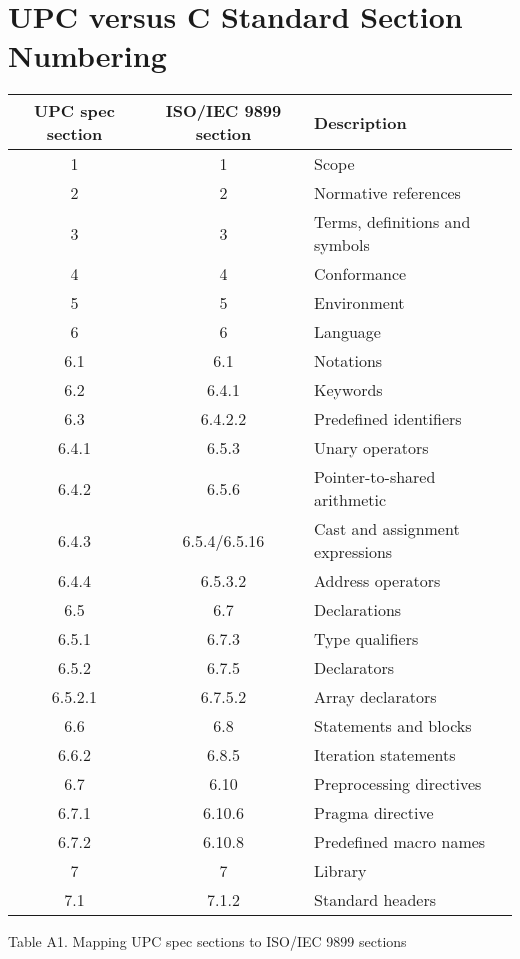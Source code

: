 \pagebreak
\section{UPC versus C Standard Section Numbering}

\begin{center}
\begin{tabular}{|c|c|l|}
\hline
UPC spec section  &   ISO/IEC 9899 section & Description \\
\hline
1   	& 1 		& Scope \\
2   	& 2 		& Normative references \\
3  	& 3 		& Terms, definitions and symbols \\
4   	& 4 		& Conformance \\
5  	& 5  		& Environment \\
6   	& 6  		& Language \\
6.1 	& 6.1		&   Notations \\
6.2 	& 6.4.1		&   Keywords \\
6.3 	& 6.4.2.2	&   Predefined identifiers \\
6.4.1 	& 6.5.3		&     Unary operators \\
6.4.2 	& 6.5.6		&     Pointer-to-shared arithmetic \\
6.4.3 	& 6.5.4/6.5.16	&     Cast and assignment expressions \\
6.4.4 	& 6.5.3.2	&     Address operators \\
6.5 	& 6.7		&   Declarations \\
6.5.1 	& 6.7.3		&     Type qualifiers \\
6.5.2 	& 6.7.5		&     Declarators \\
6.5.2.1 & 6.7.5.2	&       Array declarators \\
6.6 	& 6.8		&   Statements and blocks \\
6.6.2 	& 6.8.5		&     Iteration statements \\
6.7 	& 6.10		&   Preprocessing directives \\
6.7.1 	& 6.10.6	&     Pragma directive \\
6.7.2 	& 6.10.8	&     Predefined macro names \\
7   	& 7  		& Library \\
7.1 	& 7.1.2		&   Standard headers \\
\hline
\end{tabular}                                                  

Table A1. Mapping UPC spec sections to ISO/IEC 9899 sections  
\end{center}

